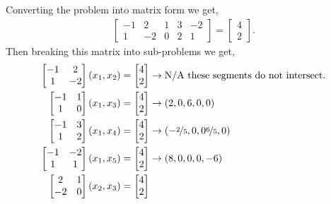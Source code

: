 \documentclass[12pt]{amsart}
\begin{document}
Converting the problem into matrix form we get,
\begin{align*}
	\begin{bmatrix}
		-1 &  2 & 1 & 3 & -2 \\
		 1 & -2 & 0 & 2 &  1
	\end{bmatrix} =
	\begin{bmatrix}
		4 \\ 2
	\end{bmatrix} .
\end{align*}
Then breaking this matrix into sub-problems we get,
\begin{align*}
	\begin{bmatrix}
		-1 &  2  \\
		 1 & -2 
	\end{bmatrix} (x_1 , x_2 ) = \begin{bmatrix} 4 \\ 2 \end{bmatrix}
		&\rightarrow \text{N/A these segments do not intersect.} \\
	\begin{bmatrix}
		-1 & 1 \\
	 	 1 & 0
	\end{bmatrix}  (x_1 , x_3 ) =  \begin{bmatrix} 4 \\ 2 \end{bmatrix}
		&\rightarrow ( 2 , 0, 6 , 0,0) \\
	\begin{bmatrix}
		-1 & 3 \\
		 1 & 2 
	\end{bmatrix}  (x_1 , x_4 ) =  \begin{bmatrix} 4 \\ 2 \end{bmatrix}
		&\rightarrow ( -\nicefrac{2}{5} ,0,0 \nicefrac{6}{5} ,0 ) \\
	\begin{bmatrix}
		-1 & -2 \\
		 1 &  1
	\end{bmatrix}  (x_1 , x_5 ) =  \begin{bmatrix} 4 \\ 2 \end{bmatrix}
		&\rightarrow ( 8 ,0,0,0, -6 ) \\
	\begin{bmatrix}
		 2 & 1 \\
		-2 & 0
	\end{bmatrix}  (x_2 , x_3 ) =\begin{bmatrix} 4 \\ 2 \end{bmatrix}

\end{align*}
\end{document}
